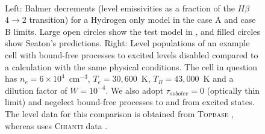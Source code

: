 \documentclass[useAMS,usenatbib,onecolumn]{mn2e2}
\begin{document}
\begin{figure}
\mbox{
\quad
{}  
}
\caption{
Left: Balmer decrements (level emissivities as a fraction of the $H\beta$ $4\rightarrow2$ transition)
for a Hydrogen only model in the case A and case B limits. Large open circles show
the test model in \py, and filled circles show Seaton's predictions.
Right: Level populations of an example cell with bound-free processes
to excited levels disabled compared to a \tar calculation with the same physical conditions. 
The cell in question has $n_e = 6\times10^4$~cm$^{-3}$, $T_e = 30,600$~K, $T_R = 43,000$~K
and a dilution factor of $W=10^{-4}$. We also adopt $\tau_{sobolev} = 0$ 
(optically thin limit) and negelect bound-free processes to and from excited states. 
The \py level data for this comparison is obtained from \textsc{Topbase} \citep{topbase2005}, whereas
\tar uses \textsc{Chianti} data \citep{chianti}.
}
\label{seaton}
\end{figure}
\end{document}
